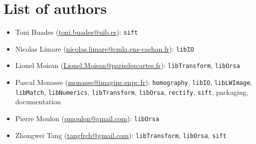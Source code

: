 \documentclass[a4paper]{article}
\begin{document}
\section*{List of authors}
\begin{itemize}
\item Toni Buades (\href{mailto:toni.buades@uib.es}{toni.buades@uib.es}): \texttt{sift}
\item Nicolas Limare (\href{mailto:nicolas.limare@cmla.ens-cachan.fr}{nicolas.limare@cmla.ens-cachan.fr}): \texttt{libIO}
\item Lionel Moisan (\href{mailto:Lionel.Moisan@parisdescartes.fr}{Lionel.Moisan@parisdescartes.fr}): \texttt{libTransform}, \texttt{libOrsa}
\item Pascal Monasse (\href{mailto:monasse@imagine.enpc.fr}{monasse@imagine.enpc.fr}): \texttt{homography}, \texttt{libIO}, \texttt{libLWImage}, \texttt{libMatch}, \texttt{libNumerics}, \texttt{libTransform}, \texttt{libOrsa}, \texttt{rectify}, \texttt{sift}, packaging, documentation
\item Pierre Moulon (\href{mailto:pmoulon@gmail.com}{pmoulon@gmail.com}): \texttt{libOrsa}
\item Zhongwei Tang (\href{mailto:tangfrch@gmail.com}{tangfrch@gmail.com}): \texttt{libTransform}, \texttt{libOrsa}, \texttt{sift}
\end{itemize}
\end{document}
